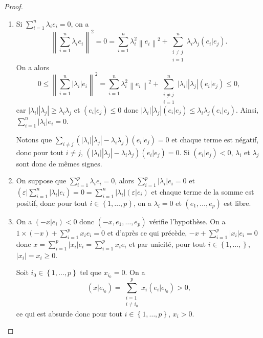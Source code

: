 \documentclass[12pt]{article}
\begin{document}
\begin{proof}
	\phantom{}
	\begin{enumerate}
		\item Si $\sum_{i=1}^{n}\lambda_i e_i=0$, on a 
		\begin{equation}
			\left\lVert\sum_{i=1}^{n}\lambda_i e_i\right\rVert^{2}=0=\sum_{i=1}^{n}\lambda_i^{2}\left\lVert e_i\right\rVert^{2}+\sum_{\substack{i\neq j\\i=1}}^{n}\lambda_i \lambda_j(e_i|e_j).
		\end{equation}
		On a alors 
		\begin{equation}
			0\leqslant\left\lVert\sum_{i=1}^{n}\left\lvert\lambda_i\right\rvert e_i\right\rVert^{2}=\sum_{i=1}^{n}\lambda_{i}^{2}\left\lVert e_i\right\rVert^{2}+\sum_{\substack{i\neq j\\ i=1}}^{n}\left\lvert \lambda_i\right\rvert\left\lvert \lambda_j\right\rvert(e_i|e_j)\leqslant0,
		\end{equation}
		car $\left\lvert\lambda_i\right\rvert\left\lvert\lambda_j\right\rvert\geqslant\lambda_i\lambda_j$ et $(e_i|e_j)\leqslant0$ donc $\left\lvert\lambda_i\right\rvert\left\lvert\lambda_j\right\rvert(e_i|e_j)\leqslant\lambda_i\lambda_j(e_i|e_j)$. Ainsi, $\sum_{i=1}^{n}\left\lvert\lambda_i\right\rvert e_i=0$.

		Notons que $\sum_{i\neq j}\left(\left\lvert\lambda_i\right\rvert\left\lvert\lambda_j\right\rvert-\lambda_i\lambda_j\right)(e_i|e_j)=0$ et chaque terme est négatif, donc pour tout $i\neq j$, $\left(\left\lvert\lambda_i\right\rvert\left\lvert\lambda_j\right\rvert-\lambda_i\lambda_j\right)(e_i|e_j)=0$. Si $(e_i|e_j)<0$, $\lambda_i$ et $\lambda_j$ sont donc de mêmes signes.

		\item On suppose que $\sum_{i=1}^{p}\lambda_i e_i=0$, alors $\sum_{i=1}^{p}\left\lvert \lambda_i\right\rvert e_i=0$ et $(\varepsilon|\sum_{i=1}^{n}\left\lvert \lambda_i\right\rvert e_i)=0=\sum_{i=1}^{n}\left\lvert\lambda_i\right\rvert(\varepsilon|e_i)$ et chaque terme de la somme est positif, donc pour tout $i\in\left\lbrace1,\dots,p\right\rbrace$, on a $\lambda_i=0$ et $(e_1,\dots,e_p)$ est libre.
		
		\item On a $(-x|e_i)<0$ donc $(-x,e_1,\dots,e_p)$ vérifie l'hypothèse. On a $1\times(-x)+\sum_{i=1}^{p}x_i e_i=0$ et d'après ce qui précède, $-x+\sum_{i=1}^{p}\left\lvert x_i\right\rvert e_i=0$ donc $x=\sum_{i=1}^{p}\left\lvert x_i\right\rvert e_i=\sum_{i=1}^{p}x_i e_i$ et par unicité, pour tout $i\in\left\lbrace1,\dots,\right\rbrace$, $\left\lvert x_i\right\rvert=x_i\geqslant0$.
		
		Soit $i_0\in\left\lbrace1,\dots,p\right\rbrace$ tel que $x_{i_0}=0$. On a 
		\begin{equation}
			(x|e_{i_0})=\sum_{\substack{i=1\\ i\neq i_0}}^{p}x_i(e_i|e_{i_0})>0,
		\end{equation}
		ce qui est absurde donc pour tout $i\in\left\lbrace1,\dots,p\right\rbrace$, $x_i>0$.
	\end{enumerate}
\end{proof}
\end{document}
